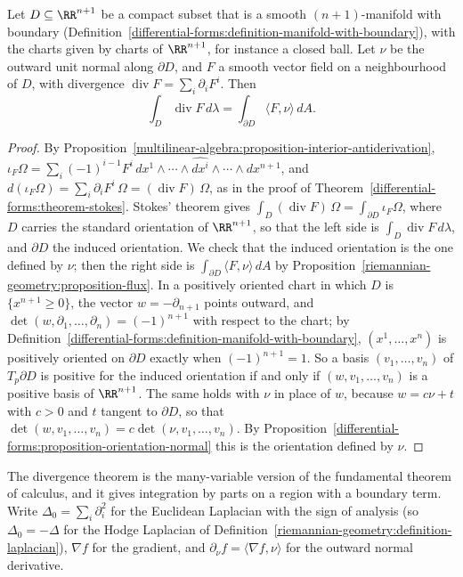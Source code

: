 \begin{corollary}\label{riemannian-geometry:corollary-divergence}
Let $D \subseteq \RR^{n+1}$ be a compact subset that is a smooth $(n+1)$-manifold with boundary (Definition~\ref{differential-forms:definition-manifold-with-boundary}),
with the charts given by charts of $\RR^{n+1}$, for instance a closed ball. Let $\nu$ be the outward unit normal along $\partial D$, and $F$ a smooth vector field on a
neighbourhood of $D$, with divergence $\operatorname{div}F = \sum_i\partial_iF^i$. Then
\[
\int_D\operatorname{div}F\,d\lambda = \int_{\partial D}\langle F, \nu\rangle\,dA .
\]
\end{corollary}

\begin{proof}
By Proposition~\ref{multilinear-algebra:proposition-interior-antiderivation},
$\iota_F\Omega = \sum_i(-1)^{i-1}F^i\,dx^1 \wedge \cdots \wedge \widehat{dx^i} \wedge \cdots \wedge dx^{n+1}$, and
$d(\iota_F\Omega) = \sum_i\partial_iF^i\,\Omega = (\operatorname{div}F)\,\Omega$, as in the proof of Theorem~\ref{differential-forms:theorem-stokes}. Stokes' theorem gives
$\int_D(\operatorname{div}F)\,\Omega = \int_{\partial D}\iota_F\Omega$, where $D$ carries the standard orientation of $\RR^{n+1}$, so that the left side is
$\int_D\operatorname{div}F\,d\lambda$, and $\partial D$ the induced orientation. We check that the induced orientation is the one defined by $\nu$; then the right side is
$\int_{\partial D}\langle F, \nu\rangle\,dA$ by Proposition~\ref{riemannian-geometry:proposition-flux}. In a positively oriented chart in which $D$ is
$\{x^{n+1} \geq 0\}$, the vector $w = -\partial_{n+1}$ points outward, and $\det(w, \partial_1, \ldots, \partial_n) = (-1)^{n+1}$ with respect to the chart; by
Definition~\ref{differential-forms:definition-manifold-with-boundary}, $(x^1, \ldots, x^n)$ is positively oriented on $\partial D$ exactly when $(-1)^{n+1} = 1$. So a
basis $(v_1, \ldots, v_n)$ of $T_p\partial D$ is positive for the induced orientation if and only if $(w, v_1, \ldots, v_n)$ is a positive basis of $\RR^{n+1}$. The same
holds with $\nu$ in place of $w$, because $w = c\nu + t$ with $c > 0$ and $t$ tangent to $\partial D$, so that $\det(w, v_1, \ldots, v_n) = c\det(\nu, v_1, \ldots, v_n)$.
By Proposition~\ref{differential-forms:proposition-orientation-normal} this is the orientation defined by $\nu$.
\end{proof}

The divergence theorem is the many-variable version of the fundamental theorem of calculus, and it gives integration by parts on a region with a boundary term. Write $\Delta_0 = \sum_i\partial_i^2$
for the Euclidean Laplacian with the sign of analysis (so $\Delta_0 = -\Delta$ for the Hodge Laplacian of Definition~\ref{riemannian-geometry:definition-laplacian}), $\nabla f$ for the gradient, and
$\partial_\nu f = \langle\nabla f, \nu\rangle$ for the outward normal derivative.

